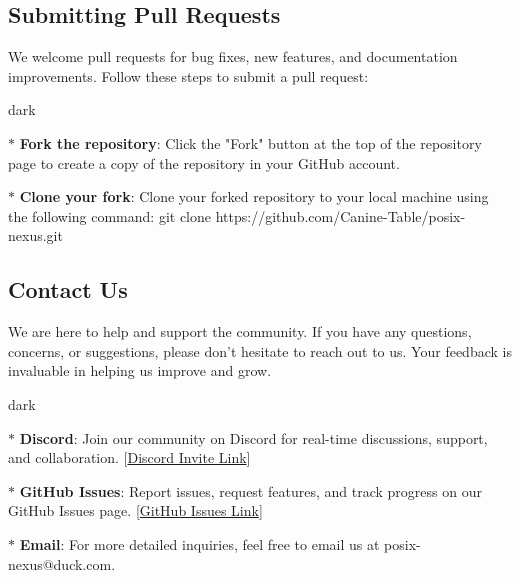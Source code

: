 \subsection{Submitting Pull Requests}
We welcome pull requests for bug fixes, new features, and documentation improvements.
Follow these steps to submit a pull request:
\bigskip
\begin{baseBoxOne}{}{dark}
    \begin{posnexItemize}
        \item[$\ast$] \textbf{Fork the repository}: Click the "Fork" button at the top of the repository page to create a copy of the repository in your GitHub account.
        \item[$\ast$] \textbf{Clone your fork}: Clone your forked repository to your local machine using the following command:
        git clone https://github.com/Canine-Table/posix-nexus.git
    \end{posnexItemize}
\end{baseBoxOne}

\subsection{Contact Us}
We are here to help and support the community. If you have any questions, concerns, or suggestions, please don't hesitate to reach out to us. Your feedback is invaluable in helping us improve and grow.
\bigskip
\begin{baseBoxOne}{}{dark}
    \begin{posnexItemize}
        \item[$\ast$] \textbf{Discord}: Join our  community on Discord for real-time discussions, support, and collaboration. [\href{https://discord.gg/GB9twwpCNM}{Discord Invite Link}]
        \item[$\ast$] \textbf{GitHub Issues}: Report issues, request features, and track progress on our GitHub Issues page. [\href{https://github.com/Canine-Table/posix-nexus/issues}{GitHub Issues Link}]
        \item[$\ast$] \textbf{Email}: For more detailed inquiries, feel free to email us at posix-nexus@duck.com.
    \end{posnexItemize}
\end{baseBoxOne}
